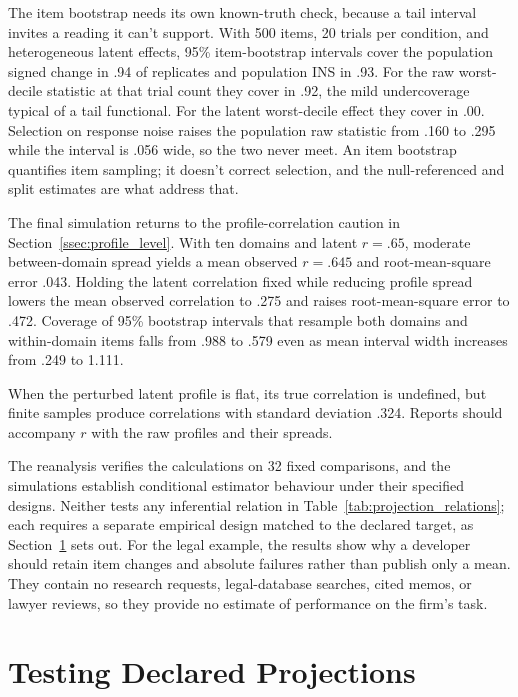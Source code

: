 \documentclass[12pt]{article}
\begin{document}
The item bootstrap needs its own known-truth check, because a tail interval invites a reading it can't support. With 500 items, 20 trials per condition, and heterogeneous latent effects, 95\% item-bootstrap intervals cover the population signed change in .94 of replicates and population INS in .93. For the raw worst-decile statistic at that trial count they cover in .92, the mild undercoverage typical of a tail functional. For the latent worst-decile effect they cover in .00. Selection on response noise raises the population raw statistic from .160 to .295 while the interval is .056 wide, so the two never meet. An item bootstrap quantifies item sampling; it doesn't correct selection, and the null-referenced and split estimates are what address that.

The final simulation returns to the profile-correlation caution in Section~\ref{ssec:profile_level}. With ten domains and latent \(r=.65\), moderate between-domain spread yields a mean observed \(r=.645\) and root-mean-square error .043. Holding the latent correlation fixed while reducing profile spread lowers the mean observed correlation to .275 and raises root-mean-square error to .472. Coverage of 95\% bootstrap intervals that resample both domains and within-domain items falls from .988 to .579 even as mean interval width increases from .249 to 1.111.

When the perturbed latent profile is flat, its true correlation is undefined, but finite samples produce correlations with standard deviation .324. Reports should accompany \(r\) with the raw profiles and their spreads.

The reanalysis verifies the calculations on 32 fixed comparisons, and the simulations establish conditional estimator behaviour under their specified designs. Neither tests any inferential relation in Table~\ref{tab:projection_relations}; each requires a separate empirical design matched to the declared target, as Section~\ref{sec:validation} sets out. For the legal example, the results show why a developer should retain item changes and absolute failures rather than publish only a mean. They contain no research requests, legal-database searches, cited memos, or lawyer reviews, so they provide no estimate of performance on the firm's task.

\section{Testing Declared Projections}\label{sec:validation}
\end{document}
